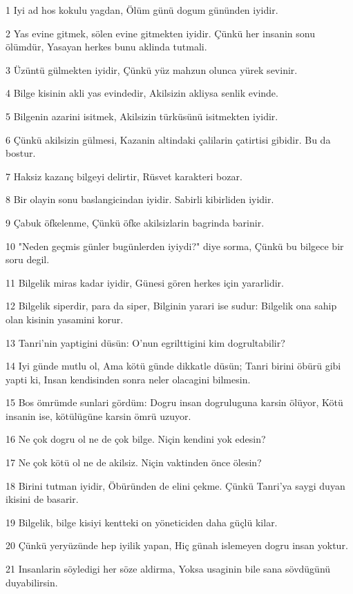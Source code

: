 \par 1 Iyi ad hos kokulu yagdan, Ölüm günü dogum gününden iyidir.
\par 2 Yas evine gitmek, sölen evine gitmekten iyidir. Çünkü her insanin sonu ölümdür, Yasayan herkes bunu aklinda tutmali.
\par 3 Üzüntü gülmekten iyidir, Çünkü yüz mahzun olunca yürek sevinir.
\par 4 Bilge kisinin akli yas evindedir, Akilsizin akliysa senlik evinde.
\par 5 Bilgenin azarini isitmek, Akilsizin türküsünü isitmekten iyidir.
\par 6 Çünkü akilsizin gülmesi, Kazanin altindaki çalilarin çatirtisi gibidir. Bu da bostur.
\par 7 Haksiz kazanç bilgeyi delirtir, Rüsvet karakteri bozar.
\par 8 Bir olayin sonu baslangicindan iyidir. Sabirli kibirliden iyidir.
\par 9 Çabuk öfkelenme, Çünkü öfke akilsizlarin bagrinda barinir.
\par 10 "Neden geçmis günler bugünlerden iyiydi?" diye sorma, Çünkü bu bilgece bir soru degil.
\par 11 Bilgelik miras kadar iyidir, Günesi gören herkes için yararlidir.
\par 12 Bilgelik siperdir, para da siper, Bilginin yarari ise sudur: Bilgelik ona sahip olan kisinin yasamini korur.
\par 13 Tanri'nin yaptigini düsün: O'nun egrilttigini kim dogrultabilir?
\par 14 Iyi günde mutlu ol, Ama kötü günde dikkatle düsün; Tanri birini öbürü gibi yapti ki, Insan kendisinden sonra neler olacagini bilmesin.
\par 15 Bos ömrümde sunlari gördüm: Dogru insan dogruluguna karsin ölüyor, Kötü insanin ise, kötülügüne karsin ömrü uzuyor.
\par 16 Ne çok dogru ol ne de çok bilge. Niçin kendini yok edesin?
\par 17 Ne çok kötü ol ne de akilsiz. Niçin vaktinden önce ölesin?
\par 18 Birini tutman iyidir, Öbüründen de elini çekme. Çünkü Tanri'ya saygi duyan ikisini de basarir.
\par 19 Bilgelik, bilge kisiyi kentteki on yöneticiden daha güçlü kilar.
\par 20 Çünkü yeryüzünde hep iyilik yapan, Hiç günah islemeyen dogru insan yoktur.
\par 21 Insanlarin söyledigi her söze aldirma, Yoksa usaginin bile sana sövdügünü duyabilirsin.
